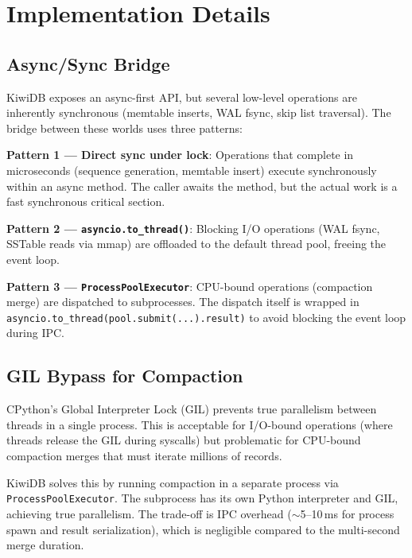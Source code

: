 \documentclass[conference]{IEEEtran}
\begin{document}
\section{Implementation Details}
\label{sec:implementation}

\subsection{Async/Sync Bridge}

KiwiDB exposes an async-first API, but several low-level operations are inherently synchronous (memtable inserts, WAL fsync, skip list traversal). The bridge between these worlds uses three patterns:

\textbf{Pattern 1 --- Direct sync under lock}: Operations that complete in microseconds (sequence generation, memtable insert) execute synchronously within an async method. The caller awaits the method, but the actual work is a fast synchronous critical section.

\textbf{Pattern 2 --- \texttt{asyncio.to\_thread()}}: Blocking I/O operations (WAL fsync, SSTable reads via mmap) are offloaded to the default thread pool, freeing the event loop.

\textbf{Pattern 3 --- \texttt{ProcessPoolExecutor}}: CPU-bound operations (compaction merge) are dispatched to subprocesses. The dispatch itself is wrapped in \texttt{asyncio.to\_thread(pool.submit(...).result)} to avoid blocking the event loop during IPC.

\subsection{GIL Bypass for Compaction}

CPython's Global Interpreter Lock (GIL) prevents true parallelism between threads in a single process. This is acceptable for I/O-bound operations (where threads release the GIL during syscalls) but problematic for CPU-bound compaction merges that must iterate millions of records.

KiwiDB solves this by running compaction in a separate process via \texttt{ProcessPoolExecutor}. The subprocess has its own Python interpreter and GIL, achieving true parallelism. The trade-off is IPC overhead ($\sim$5--10\,ms for process spawn and result serialization), which is negligible compared to the multi-second merge duration.
\end{document}
